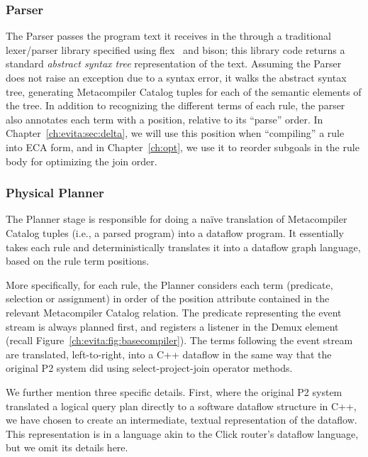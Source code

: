 \subsubsection{Parser}
\label{ch:evita:sec:parser}

The Parser passes the program text it receives in the  through
a traditional lexer/parser library specified using flex~\cite{flexUrl} and
bison\cite{bisonUrl}; this library code returns a standard {\em abstract syntax
tree} representation of the text.  Assuming the Parser does not raise an
exception due to a syntax error, it walks the abstract syntax tree, generating
Metacompiler Catalog tuples for each of the semantic elements of the tree.  In
addition to recognizing the different terms of each rule, the parser also
annotates each term with a position, relative to its ``parse'' order.  In
Chapter~\ref{ch:evita:sec:delta}, we will use this position when ``compiling''
a rule into ECA form, and in Chapter~\ref{ch:opt}, we use it to reorder
subgoals in the rule body for optimizing the join order.


\subsubsection{Physical Planner}
\label{ch:evita:sec:planner}

The Planner stage is responsible for doing a na\"{i}ve translation of
Metacompiler Catalog tuples (i.e., a parsed \OVERLOG program) into a dataflow
program.  It essentially takes each rule and deterministically translates it
into a dataflow graph language, based on the rule term positions.

More specifically, for each rule, the Planner considers each term (predicate,
selection or assignment) in order of the position attribute contained in the
relevant Metacompiler Catalog relation.  The predicate representing the event
stream is always planned first, and registers a listener in the Demux element
(recall Figure~\ref{ch:evita:fig:basecompiler}).  The terms following the event
stream are translated, left-to-right, into a C++ dataflow in the same way that
the original P2 system did using select-project-join operator methods.

We further mention three specific details.  First, where the original P2
system translated a logical query plan directly to a software dataflow
structure in C++, we have chosen to create an intermediate, textual
representation of the dataflow.  This representation is in a language akin to
the Click router's dataflow language, but we omit its details here.

